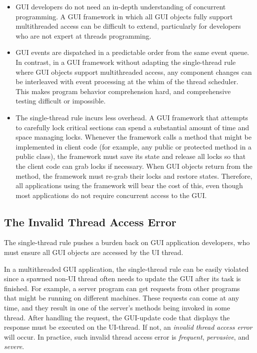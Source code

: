 \begin{itemize}

\item GUI developers do not need an in-depth
understanding of concurrent programming. A GUI framework in which all GUI objects
fully support multithreaded access can be difficult to extend, particularly
for developers who are not expert at threads programming.

\item GUI events are dispatched in a predictable order from the same event queue.
In contrast, in a GUI framework without adapting the single-thread rule where GUI objects 
support multithreaded access, any component changes can be interleaved with event
processing at the whim of the thread scheduler. This makes program behavior comprehension hard,
 and comprehensive testing difficult or impossible. 

\item The single-thread rule incurs less overhead.
A GUI framework that attempts to carefully lock critical sections can spend a substantial
amount of time and space managing locks. Whenever the framework calls a method that might
be implemented in client code (for example, any public or protected method in a public class),
the framework must save its state and release all locks so that the client code can grab locks
if necessary. When GUI objects return from the method, the framework must re-grab their locks and
restore states. Therefore, all applications using the framework will bear the cost of this, even though most
applications do not require concurrent access to the GUI.

\end{itemize}


\subsection{The Invalid Thread Access Error}

The single-thread rule pushes a burden back on GUI application developers,
who must ensure all GUI objects are accessed by the UI thread.

In a multithreaded GUI application, the single-thread rule can be
easily violated since a spawned non-UI thread often needs to update
the GUI  after its  task is finished.
For example, a server program can get requests from other programs
that might be running on different machines. These requests can come at any time,
and they result in one of the server's methods being invoked in some thread.
After handling the request, the GUI-update code that displays the response must be executed on the UI-thread.
If not, an \textit{invalid thread access error} will occur. In practice, such
invalid thread access error is \textit{frequent}, \textit{pervasive}, and \textit{severe}.

